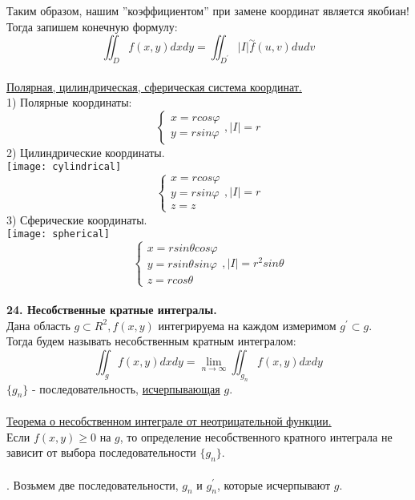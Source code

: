 \documentclass[12pt]{article}
\begin{document}
Таким образом, нашим ''коэффициентом'' при замене координат является якобиан!\\
Тогда запишем конечную формулу:\\
$$\iint_D f(x,y) dxdy = \iint_{D^{'}} |I|\overset{\sim}{f}(u,v) dudv$$
\\
\label{question23_2}\uline{Полярная, цилиндрическая, сферическая система координат.}\\
1) Полярные координаты:\\
$$\begin{cases}x=rcos\varphi \\ y=rsin\varphi \end{cases},|I| = r$$
2) Цилиндрические координаты.\\
\texttt{[image: cylindrical]}\\
$$\begin{cases}x=rcos\varphi \\ y=rsin\varphi \\ z=z \end{cases},|I| = r$$
3) Сферические координаты.\\
\texttt{[image: spherical]}\\
$$\begin{cases}x=rsin\theta cos\varphi \\ y=rsin\theta sin\varphi \\ z=rcos\theta \end{cases},|I| = r^2 sin\theta$$
\\
\label{question24_1}\textbf{24. Несобственные кратные интегралы.}\\
Дана область $g \subset R^2, f(x,y)$ интегрируема на каждом измеримом $g^{'} \subset g$.\\
Тогда будем называть несобственным кратным интегралом:\\
$$\iint_g f(x,y) dxdy = \lim_{n\to\infty} \iint_{g_n} f(x,y)dxdy$$
$\{g_n\}$ - последовательность, \hyperref[exhaustSeq]{исчерпывающая} $g$.\\
\\
\label{question24_2}\uline{Теорема о несобственном интеграле от неотрицательной функции.}\\
Если $f(x,y) \geq 0$ на $g$, то определение несобственного кратного интеграла не зависит от выбора последовательности $\{g_n\}$.\\
\\
. Возьмем две последовательности, $g_n$ и $g^{'}_n$, которые исчерпывают $g$.\\
\end{document}
